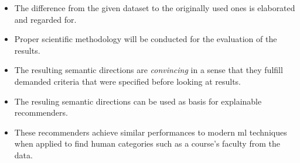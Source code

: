 \begin{itemize}
	\item The difference from the given dataset to the originally used ones is elaborated and regarded for.
	\item Proper scientific methodology will be conducted for the evaluation of the results.
	\item The resulting semantic directions are \textit{convincing} in a sense that they fulfill demanded criteria that were specified before looking at results.
	\item The resuling semantic directions can be used as basis for explainable recommenders.
	\item These recommenders achieve similar performances to modern \gls{ml} techniques when applied to find human categories such as a course's faculty from the data.
\end{itemize}


